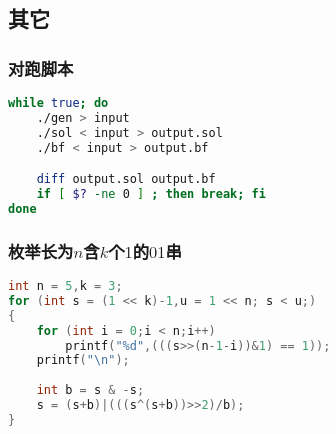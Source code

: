 \subsection{其它}
    \subsubsection{对跑脚本}
	\begin{lstlisting}[language=sh]
while true; do
	./gen > input
	./sol < input > output.sol
	./bf < input > output.bf

	diff output.sol output.bf
	if [ $? -ne 0 ] ; then break; fi
done
	\end{lstlisting}
    \subsubsection{枚举长为$n$含$k$个$1$的$01$串}
	\begin{lstlisting}[language=c++]
int n = 5,k = 3;
for (int s = (1 << k)-1,u = 1 << n; s < u;)
{
    for (int i = 0;i < n;i++)
        printf("%d",(((s>>(n-1-i))&1) == 1));
    printf("\n");
    
    int b = s & -s;
    s = (s+b)|(((s^(s+b))>>2)/b);
}
	\end{lstlisting}